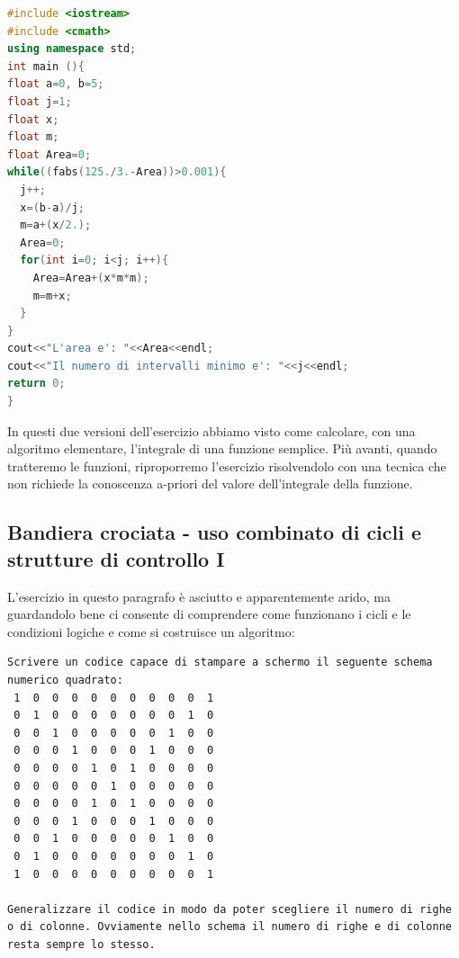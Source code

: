 \documentclass[11pt,fleqn]{book} %
\begin{document}
\begin{lstlisting}[language=c++]
#include <iostream>
#include <cmath>
using namespace std;
int main (){
float a=0, b=5;
float j=1;
float x;
float m;
float Area=0;
while((fabs(125./3.-Area))>0.001){
  j++;
  x=(b-a)/j;
  m=a+(x/2.);
  Area=0;
  for(int i=0; i<j; i++){
    Area=Area+(x*m*m);
    m=m+x;
  }
}
cout<<"L'area e': "<<Area<<endl;
cout<<"Il numero di intervalli minimo e': "<<j<<endl;
return 0;
}
\end{lstlisting}

In questi due versioni dell'esercizio abbiamo visto come calcolare, con una algoritmo elementare, l'integrale di una funzione semplice. Più avanti, quando tratteremo le funzioni, riproporremo l'esercizio risolvendolo con una tecnica che non richiede la conoscenza a-priori del valore dell'integrale della funzione. 


\subsection{Bandiera crociata - uso combinato di cicli e strutture di controllo I}

L'esercizio in questo paragrafo è asciutto e apparentemente arido, ma guardandolo bene ci consente di comprendere come funzionano i cicli e le condizioni logiche e come si costruisce un algoritmo:

\begin{verbatim}
Scrivere un codice capace di stampare a schermo il seguente schema numerico quadrato:
 1  0  0  0  0  0  0  0  0  0  1 
 0  1  0  0  0  0  0  0  0  1  0 
 0  0  1  0  0  0  0  0  1  0  0 
 0  0  0  1  0  0  0  1  0  0  0 
 0  0  0  0  1  0  1  0  0  0  0 
 0  0  0  0  0  1  0  0  0  0  0 
 0  0  0  0  1  0  1  0  0  0  0 
 0  0  0  1  0  0  0  1  0  0  0 
 0  0  1  0  0  0  0  0  1  0  0 
 0  1  0  0  0  0  0  0  0  1  0 
 1  0  0  0  0  0  0  0  0  0  1
 
Generalizzare il codice in modo da poter scegliere il numero di righe
o di colonne. Ovviamente nello schema il numero di righe e di colonne
resta sempre lo stesso.
\end{verbatim}
\end{document}

